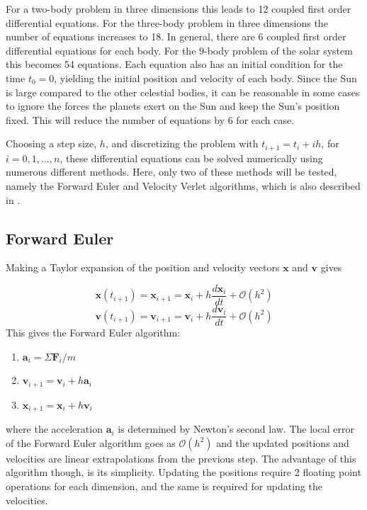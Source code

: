\documentclass{article}
\begin{document}
For a two-body problem in three dimensions this leads to 12 coupled first order differential equations. For the three-body problem in three dimensions the number of equations increases to 18. In general, there are 6 coupled first order differential equations for each body. For the 9-body problem of the solar system this becomes 54 equations. Each equation also has an initial condition for the time $t_0=0$, yielding the initial position and velocity of each body. Since the Sun is large compared to the other celestial bodies, it can be reasonable in some cases to ignore the forces the planets exert on the Sun and keep the Sun's position fixed. This will reduce the number of equations by 6 for each case.

Choosing a step size, $h$, and discretizing the problem with $t_{i+1} = t_i + ih$, for $i=0,1,...,n$, these differential equations can be solved numerically using numerous different methods. Here, only two of these methods will be tested, namely the Forward Euler and Velocity Verlet algorithms, which is also described in \cite{lectures}.

\subsection{Forward Euler}
\label{sec:euler}
Making a Taylor expansion of the position and velocity vectors $\bm{x}$ and $\bm{v}$ gives

\begin{equation}
\bm{x}(t_{i+1}) = \bm{x}_{i+1} = \bm{x}_i + h\frac{d\bm{x}_i}{dt} + \mathcal{O}(h^2)
\end{equation}
\begin{equation} 
\bm{v}(t_{i+1}) = \bm{v}_{i+1} = \bm{v}_i + h\frac{d\bm{v}_i}{dt} + \mathcal{O}(h^2)
\end{equation} 
This gives the Forward Euler algorithm:
\begin{enumerate}
\item $\bm{a}_i = \Sigma\bm{F}_i/m$
\item $\bm{v}_{i+1} = \bm{v}_i + h\bm{a}_i$
\item $\bm{x}_{i+1} = \bm{x}_i + h\bm{v}_i$
\end{enumerate}
where the acceleration $\bm{a}_i$ is determined by Newton's second law. The local error of the Forward Euler algorithm goes as $\mathcal{O}(h^2)$ and the updated positions and velocities are linear extrapolations from the previous step. The advantage of this algorithm though, is its simplicity. Updating the positions require 2 floating point operations for each dimension, and the same is required for updating the velocities.
\end{document}
